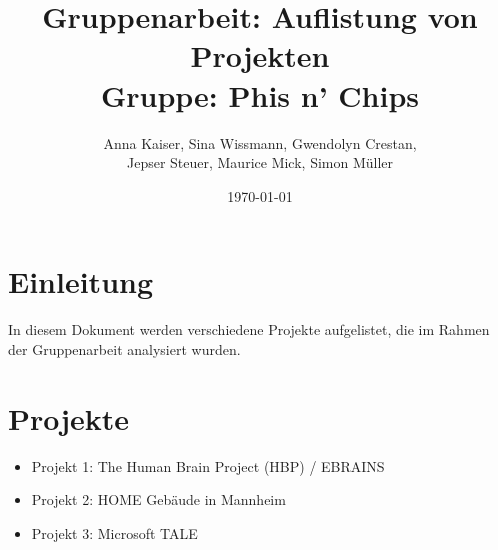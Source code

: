 \documentclass{article}
\title{
    \vspace*{5cm}
    Gruppenarbeit: Auflistung von Projekten \\ Gruppe: Phis n' Chips}
\author{Anna Kaiser, Sina Wissmann, Gwendolyn Crestan, \\ Jepser Steuer, Maurice Mick, Simon Müller}
\date{\today}
\begin{document}
\maketitle
\clearpage %
\section{Einleitung}
In diesem Dokument werden verschiedene Projekte aufgelistet, die im Rahmen der Gruppenarbeit analysiert wurden.

\section{Projekte}
\begin{itemize}
    \item Projekt 1: The Human Brain Project (HBP) / EBRAINS
    \item Projekt 2: HOME Gebäude in Mannheim
    \item Projekt 3: Microsoft TALE
\end{itemize}

\clearpage
\end{document}
